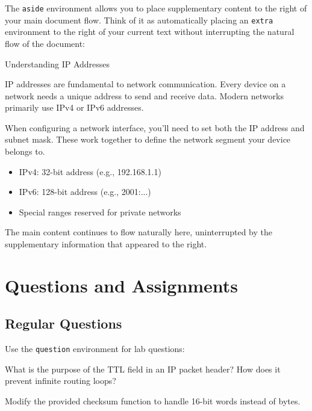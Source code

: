 \documentclass[12pt]{labmanual}
\begin{document}
The \texttt{aside} environment allows you to place supplementary content to the right of your main document flow. Think of it as automatically placing an \texttt{extra} environment to the right of your current text without interrupting the natural flow of the document:

\begin{aside}[0.6,0.4]{Understanding IP Addresses}
\begin{leftcontent}
IP addresses are fundamental to network communication. Every device on a network needs a unique address to send and receive data. Modern networks primarily use IPv4 or IPv6 addresses.

When configuring a network interface, you'll need to set both the IP address and subnet mask. These work together to define the network segment your device belongs to.
\end{leftcontent}
\begin{rightcontent}
\begin{itemize}
\item IPv4: 32-bit address (e.g., 192.168.1.1)
\item IPv6: 128-bit address (e.g., 2001:...)
\item Special ranges reserved for private networks
\end{itemize}
\end{rightcontent}
\end{aside}

The main content continues to flow naturally here, uninterrupted by the supplementary information that appeared to the right.

\section{Questions and Assignments}

\subsection{Regular Questions}

Use the \texttt{question} environment for lab questions:

\begin{question}
What is the purpose of the TTL field in an IP packet header? How does it prevent infinite routing loops?
\end{question}

\begin{question}[Implementation]
Modify the provided checksum function to handle 16-bit words instead of bytes.
\end{question}
\end{document}
